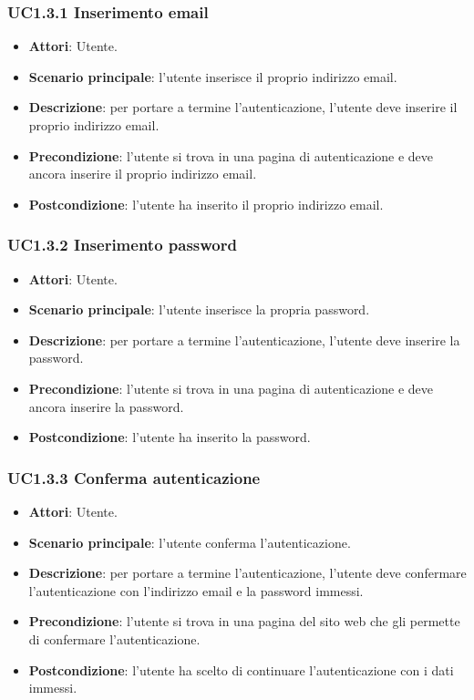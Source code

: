 \subsubsection{UC1.3.1 Inserimento email}
\begin{itemize}
\item \textbf{Attori}: Utente.
\item \textbf{Scenario principale}: l'utente inserisce il proprio indirizzo email.
\item \textbf{Descrizione}: per portare a termine l'autenticazione, l'utente deve inserire il proprio indirizzo email.
\item \textbf{Precondizione}: l'utente si trova in una pagina di autenticazione e deve ancora inserire il proprio indirizzo email.
\item \textbf{Postcondizione}: l'utente ha inserito il proprio indirizzo email.
\end{itemize}
\subsubsection{UC1.3.2 Inserimento password}
\begin{itemize}
\item \textbf{Attori}: Utente.
\item \textbf{Scenario principale}: l'utente inserisce la propria password.
\item \textbf{Descrizione}: per portare a termine l'autenticazione, l'utente deve inserire la password.
\item \textbf{Precondizione}: l'utente si trova in una pagina di autenticazione e deve ancora inserire la password.
\item \textbf{Postcondizione}: l'utente ha inserito la password.
\end{itemize}
\subsubsection{UC1.3.3 Conferma autenticazione}
\begin{itemize}
\item \textbf{Attori}: Utente.
\item \textbf{Scenario principale}: l'utente conferma l'autenticazione.
\item \textbf{Descrizione}: per portare a termine l'autenticazione, l'utente deve confermare l'autenticazione con l'indirizzo email e  la password immessi.
\item \textbf{Precondizione}: l'utente si trova in una pagina del sito web che gli permette di confermare l'autenticazione.
\item \textbf{Postcondizione}: l'utente ha scelto di continuare l'autenticazione con i dati immessi.
\end{itemize}
